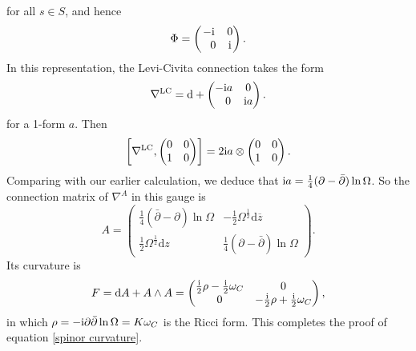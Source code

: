 \documentclass[10pt,a4paper]{amsart}
\newcommand{\1}{{\mathbb{1}}}
\def \d{\mathrm{d}}
\newcommand{\ol}{\overline}
\numberwithin{equation}{section}
\begin{document}
for all $s\in S$, and hence
\begin{equation}
\label{spinor Phi}
\Phi = \begin{pmatrix}-{\rm i}&0\\\hphantom{-}0&{\rm i}\end{pmatrix}.
\end{equation}
In this representation, the Levi-Civita connection takes the form
\begin{equation*}
\nabla^{\rm LC}=\d+\begin{pmatrix}-{\rm i} a & 0 \\ \hphantom{-}0 & {\rm i} a\end{pmatrix}.
\end{equation*}
for a 1-form $a$. Then
\begin{equation*}
\left[ \nabla^{\rm LC},\begin{pmatrix}0&0\\1&0\end{pmatrix}\right] = 2{\rm i} a\otimes \begin{pmatrix}0&0\\1&0\end{pmatrix}.
\end{equation*}
Comparing with our earlier calculation, we deduce that ${\rm i} a = \frac{1}{4}(\partial-\bar{\partial})\ln\Omega$. So the connection matrix of $\nabla^A$ in this gauge is
\begin{equation*}
A = \begin{pmatrix} \frac{1}{4}(\bar{\partial}-\partial)\ln\Omega & -\frac{1}{2}\Omega^{\frac12}\d\ol{z} \\ \frac{1}{2}\Omega^{\frac12}\d z & \frac{1}{4}(\partial-\bar{\partial})\ln\Omega\end{pmatrix}.
\end{equation*}
Its curvature is
\begin{equation}
\label{spinor F}
F=\d A+A\wedge A = \begin{pmatrix} \frac{{\rm i}}{2}\rho -\frac{{\rm i}}{2}\omega_C & 0 \\ 0 & -\frac{{\rm i}}{2}\rho +\frac{{\rm i}}{2}\omega_C\end{pmatrix},
\end{equation}
in which $\rho=-{\rm i}\partial\bar{\partial}\ln\Omega=K\omega_C$ is the Ricci form. This completes the proof of equation \eqref{spinor curvature}.
\end{document}
